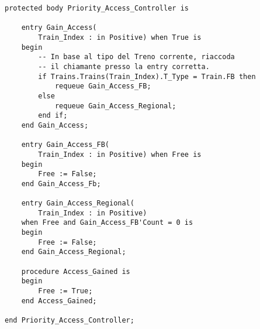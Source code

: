 \begin{lstlisting}[label=coda:priority_access,caption=\small{Realizzazione di \ttt{Priority\_Access\_Controller} per permettere esecuzione preferenziale a Task rappresentanti treni di tipo \ttt{FB}}]
protected body Priority_Access_Controller is

	entry Gain_Access(
		Train_Index : in Positive) when True is
	begin
		-- In base al tipo del Treno corrente, riaccoda
		-- il chiamante presso la entry corretta.
		if Trains.Trains(Train_Index).T_Type = Train.FB then
			requeue Gain_Access_FB;
		else
			requeue Gain_Access_Regional;
		end if;
	end Gain_Access;

	entry Gain_Access_FB(
		Train_Index : in Positive) when Free is
	begin
		Free := False;
	end Gain_Access_Fb;

	entry Gain_Access_Regional(
		Train_Index : in Positive) 
	when Free and Gain_Access_FB'Count = 0 is
	begin
		Free := False;
	end Gain_Access_Regional;

 	procedure Access_Gained is
	begin
		Free := True;
	end Access_Gained;

end Priority_Access_Controller;
\end{lstlisting}
